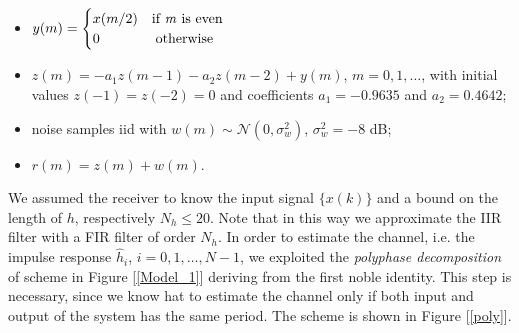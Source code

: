 \documentclass[a4paper, 12pt]{report}
\begin{document}
\begin{itemize}
	\item $y(m) = \begin{cases}
					x(m/2)  \quad \text{if \textit{m} is even} \\
					0 \quad\quad\quad\quad \text{otherwise} 
	\end{cases} $ \\
	\item $z(m) = -a_1z(m-1)-a_2z(m-2)+y(m)$, $m=0,1,\dots$, with initial values $z(-1)=z(-2)=0$ and coefficients $a_1 = -0.9635$ and $a_2 = 0.4642$;
	\item noise samples iid with $w(m)\sim\mathcal{N}(0,\sigma_w^2)$, $\sigma_w^2=-8$ dB;
	\item $r(m) = z(m)+w(m)$.
\end{itemize}
We assumed the receiver to know the input signal $\{ x(k)\}$ and a bound on the length of $h$, respectively $N_h \le 20$. Note that in this way we approximate the IIR filter with a FIR filter of order $N_h$. In order to estimate the channel, i.e. the impulse response $\hat{h}_i$, $i=0,1,\dots,N-1$, we exploited the \textit{polyphase decomposition} of scheme in Figure [\ref{Model_1}] deriving from the first noble identity. This step is necessary, since we know hat to estimate the channel only if both input and output of the system has the same period. The scheme is shown in Figure [\ref{poly}].
\end{document}
